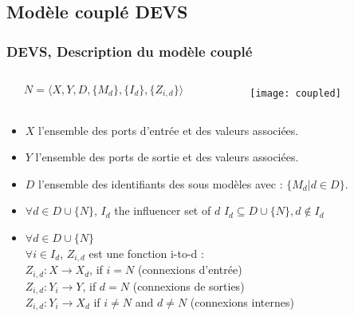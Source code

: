 \documentclass[xetex, compress, table, dvipsnames]{beamer}
\begin{document}
\subsection{Modèle couplé DEVS}

\begin{frame}
  \frametitle{DEVS, Description du modèle couplé}
  \begin{exampleblock}{}
    \begin{columns}
      \begin{column}[c]{.45\textwidth}
        \begin{equation*}
          N = \langle X, Y, D, \{M_d\}, \{I_d\}, \{Z_{i,d}\} \rangle
        \end{equation*}
      \end{column}
      \begin{column}{.45\textwidth}
        \begin{figure}[h]
          \begin{center}
            \texttt{[image: coupled]}
          \end{center}
        \end{figure}
      \end{column}
    \end{columns}
  \end{exampleblock}
  \begin{exampleblock}{}
    \begin{itemize}[<+->]
    \item $X$ l'ensemble des \alert{ports d'entrée} et des valeurs
      associées.
    \item $Y$ l'ensemble des \alert{ports de sortie} et des valeurs
      associées.
    \item $D$ l'ensemble des \alert{identifiants des sous modèles}
      avec : $\{ M_d | d \in D \}$.
    \item $\forall d \in D \cup \{N\}$, $I_d$ the influencer set of
      $d$ $I_d \subseteq D \cup \{N\},d \notin I_d$
    \item $\forall d \in D \cup \{N\}$\\
      $\forall i \in I_d$, $Z_{i,d}$ est une fonction i-to-d :\\
      \hspace{1cm}$Z_{i,d}:X \rightarrow X_d$, if $i = N$ (connexions d'entrée)\\
      \hspace{1cm}$Z_{i,d}:Y_i \rightarrow Y$, if $d = N$ (connexions de sorties)\\
      \hspace{1cm}$Z_{i,d}:Y_i \rightarrow X_d$ if $i \neq N$ and $d
      \neq N$ (connexions internes)
    \end{itemize}
  \end{exampleblock}
\end{frame}
\end{document}
